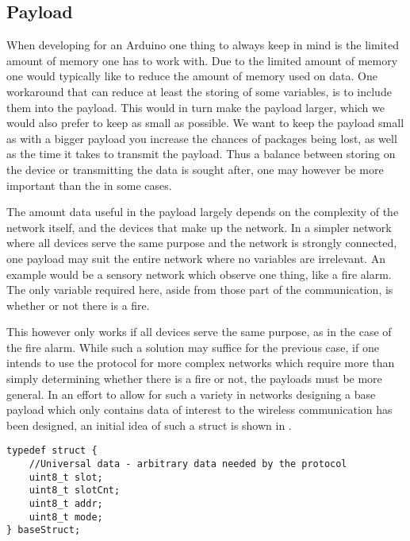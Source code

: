 \subsection{Payload}
When developing for an Arduino one thing to always keep in mind is the limited amount of memory one has to work with.
Due to the limited amount of memory one would typically like to reduce the amount of memory used on data.
One workaround that can reduce at least the storing of some variables, is to include them into the payload.
This would in turn make the payload larger, which we would also prefer to keep as small as possible.
We want to keep the payload small as with a bigger payload you increase the chances of packages being lost, as well as the time it takes to transmit the payload.
Thus a balance between storing on the device or transmitting the data is sought after, one may however be more important than the in some cases.

\bigskip \noindent
The amount data useful in the payload largely depends on the complexity of the network itself, and the devices that make up the network.
In a simpler network where all devices serve the same purpose and the network is strongly connected, one payload may suit the entire network where no variables are irrelevant.
An example would be a sensory network which observe one thing, like a fire alarm.
The only variable required here, aside from those part of the communication, is whether or not there is a fire.

This however only works if all devices serve the same purpose, as in the case of the fire alarm.
While such a solution may suffice for the previous case, if one intends to use the protocol for more complex networks which require more than simply determining whether there is a fire or not, the payloads must be more general.
In an effort to allow for such a variety in networks designing a base payload which only contains data of interest to the wireless communication has been designed, an initial idea of such a struct is shown in .

\bigskip \noindent
\lstset{style=customc}
\begin{lstlisting}[style=customc,caption={Possible way the baseStruct could look for the payload},label={baseStruct}]
typedef struct {
    //Universal data - arbitrary data needed by the protocol
    uint8_t slot;
    uint8_t slotCnt;
    uint8_t addr;
    uint8_t mode;
} baseStruct;
\end{lstlisting} 

